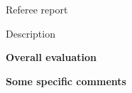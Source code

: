 \documentclass[12pt]{article}
\begin{document}
\begin{center}
{\large  }

\end{center}
\medskip

\centerline{Referee report}

\bigskip

Description


\medskip

\noindent
\textbf{Overall evaluation}

\medskip
 

\medskip

\noindent
\textbf{Some specific comments}


\
\end{document}
